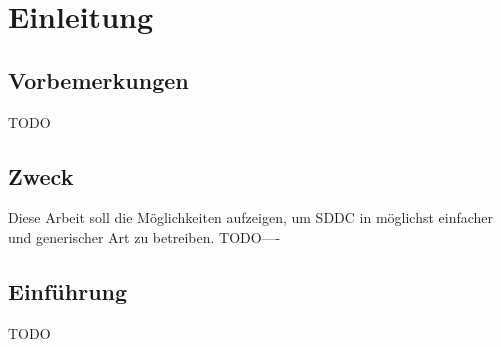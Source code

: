 \chapter{Einleitung}

\section{Vorbemerkungen}
TODO
\section{Zweck}
Diese Arbeit soll die Möglichkeiten aufzeigen, um SDDC in möglichst einfacher 
und generischer Art zu betreiben.
TODO----
\section{Einführung}
TODO